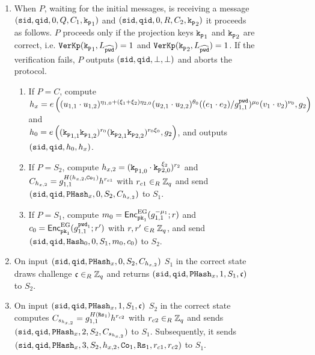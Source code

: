 \begin{figure}[htbp]
\begin{mdframed}[innertopmargin=10pt]
\begin{enumerate}
	    \item When $P$, waiting for the initial messages, is receiving a message $(\mathtt{sid},\mathtt{qid},0,Q,C_1,\mathtt{k_p}_1)$ and $(\mathtt{sid},\mathtt{qid},0,R,C_2,\mathtt{k_p}_2)$ it proceeds as follows.
	      $P$ proceeds only if the projection keys $\mathtt{k_p}_1$ and $\mathtt{k_p}_2$ are correct, i.e. $\mathtt{VerKp}(\mathtt{k_p}_1, L_{\widehat{\mathtt{pwd}}})=1$ and $\mathtt{VerKp}(\mathtt{k_p}_2, L_{\widehat{\mathtt{pwd}}})=1$.
	          If the verification fails, $P$ outputs $(\mathtt{sid}, \mathtt{qid}, \bot, \bot)$ and aborts the protocol.
	      \begin{enumerate}
	        \item If $P=C$, compute \\
	          $ h_x=e\left((u_{1,1}\cdot u_{1,2})^{\eta_{1,0}+(\xi_1+\xi_2)\eta_{2,0}} (u_{2,1}\cdot u_{2,2})^{\theta_0} ((e_1\cdot e_2)/g_{1,1}^{\mathtt{pwd}})^{\mu_0} (v_1\cdot v_2)^{\nu_0}, g_2\right) $ and \\
	          $ h_0=e\left( (\mathtt{k_p}_{1,1}\mathtt{k_p}_{1,2})^{r_0} (\mathtt{k_p}_{2,1}\mathtt{k_p}_{2,2})^{r_0\xi_0}, g_2 \right)$,
	          and outputs $(\mathtt{sid}, \mathtt{qid}, h_0, h_x)$.\\
	        \item If $P=S_2$, compute
	          $h_{x,2} = (\mathtt{k_p}_{1,0} \cdot \mathtt{k_p}_{2,0}^{\xi_2})^{r_2}$ and 
	          $C_{h_{x,2}}=g_{1,1}^{H(h_{x,2}, \mathtt{Co}_{1})} h^{r_{c1}}$ with $r_{c1}\in_R\mathbb{Z}_q$
	          and send $(\mathtt{sid},\mathtt{qid},\mathtt{PHash}_x,0,S_2,C_{h_{x,2}})$ to $S_1$.
	        \item If $P=S_1$, compute
	          $m_{0} = \mathsf{Enc}_{\mathtt{pk}_1}^\mathrm{EG}(g_{1,1}^{-\mu_1}; r)$ and
	          $c_{0} = \mathsf{Enc}_{\mathtt{pk}_1}^\mathrm{EG}(g_{1,1}^{\mathtt{pwd}_1}; r')$
	          with $r,r'\in_R\mathbb{Z}_q$, and send $(\mathtt{sid},\mathtt{qid},\mathtt{Hash}_0,0,S_1,m_0,c_0)$ to $S_2$.
	      \end{enumerate}
	      
    
	    \item On input $(\mathtt{sid},\mathtt{qid},\mathtt{PHash}_x,0,S_2,C_{h_{x,2}})$ $S_1$ in the correct state draws challenge $\mathfrak{c}\in_R\mathbb{Z}_q$ and returns $(\mathtt{sid},\mathtt{qid},\mathtt{PHash}_x,1,S_1,\mathfrak{c})$ to $S_2$.
	    
	    \item On input $(\mathtt{sid},\mathtt{qid},\mathtt{PHash}_x,1,S_1,\mathfrak{c})$ $S_2$ in the correct state computes
	    $C_{s_{h_{x,2}}}=g_{1,1}^{H(\mathtt{Rs}_{1})} h^{r_{c2}}$ with $r_{c2}\in_R\mathbb{Z}_q$
	    and sends $(\mathtt{sid},\mathtt{qid},\mathtt{PHash}_x,2,S_2,C_{s_{h_{x,2}}})$ to $S_1$.
	    Subsequently, it sends $(\mathtt{sid},\mathtt{qid},\mathtt{PHash}_x,3,S_2,h_{x,2}, \mathtt{Co}_1, \mathtt{Rs}_1, r_{c1}, r_{c2})$ to $S_1$.
	    

\end{enumerate}
\end{mdframed}
\end{figure}
